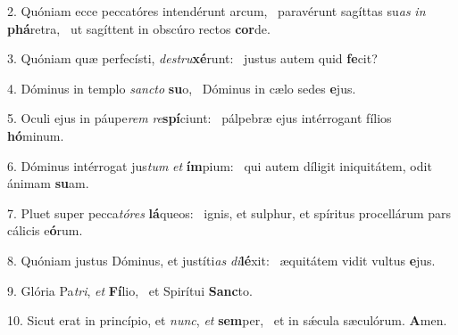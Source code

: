 2. Quóniam ecce peccatóres intendérunt arcum, \dag\  paravérunt sagíttas su\textit{as} \textit{in} \textbf{phá}retra, \ast\  ut sagíttent in obscúro rectos \textbf{cor}de.\

3. Quóniam quæ perfecísti, \textit{de}\textit{stru}\textbf{xé}runt: \ast\  justus autem quid \textbf{fe}cit?\

4. Dóminus in templo \textit{sanc}\textit{to} \textbf{su}o, \ast\  Dóminus in cælo sedes \textbf{e}jus.\

5. Oculi ejus in páupe\textit{rem} \textit{re}\textbf{spí}ciunt: \ast\  pálpebræ ejus intérrogant fílios \textbf{hó}minum.\

6. Dóminus intérrogat jus\textit{tum} \textit{et} \textbf{ím}pium: \ast\  qui autem díligit iniquitátem, odit ánimam \textbf{su}am.\

7. Pluet super pecca\textit{tó}\textit{res} \textbf{lá}queos: \ast\  ignis, et sulphur, et spíritus procellárum pars cálicis e\textbf{ó}rum.\

8. Quóniam justus Dóminus, et justíti\textit{as} \textit{di}\textbf{lé}xit: \ast\  æquitátem vidit vultus \textbf{e}jus.\

9. Glória Pa\textit{tri}, \textit{et} \textbf{Fí}lio, \ast\  et Spirítui \textbf{Sanc}to.\

10. Sicut erat in princípio, et \textit{nunc}, \textit{et} \textbf{sem}per, \ast\  et in sǽcula sæculórum. \textbf{A}men.\

